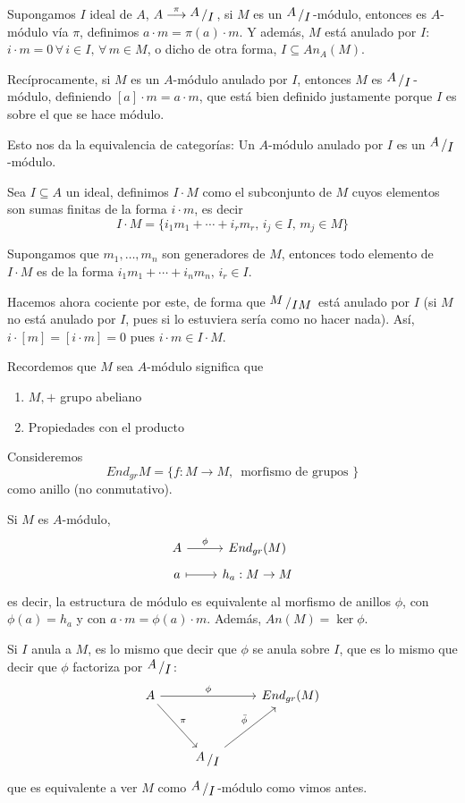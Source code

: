 \begin{obs}
    Supongamos $I$ ideal de $A$, $A \overset{\pi}{\longrightarrow} \modulo{A}{I}$, si $M$ es un $\modulo{A}{I}$-m\'odulo, entonces es $A$-m\'odulo v\'ia $\pi$, definimos $a\cdot m = \pi(a) \cdot m$. Y adem\'as, $M$ est\'a anulado por $I$: $i \cdot m = 0 \, \forall \, i \in I, \, \forall \, m \in M$, o dicho de otra forma, $I \subseteq An_A(M)$. 

    Rec\'iprocamente, si $M$ es un $A$-m\'odulo anulado por $I$, entonces $M$ es $\modulo{A}{I}$-m\'odulo, definiendo $[a] \cdot m = a \cdot m$, que est\'a bien definido justamente porque $I$ es sobre el que se hace m\'odulo.

    Esto nos da la equivalencia de categor\'ias: Un $A$-m\'odulo anulado por $I$ es un $\modulo{A}{I}$-m\'odulo.

    Sea $I \subseteq A$ un ideal, definimos $I \cdot M$ como el subconjunto de $M$ cuyos elementos son sumas finitas de la forma $i \cdot m$, es decir
    $$I\cdot M = \{ i_1 m_1 + \cdots + i_r m_r , \, i_j \in I, \, m_j \in M \}$$

    Supongamos que $m_1, \ldots, m_n$ son generadores de $M$, entonces todo elemento de $I\cdot M$ es de la forma $i_1 m_1 + \cdots + i_n m_n , \, i_r \in I$.

    Hacemos ahora cociente por este, de forma que $\modulo{M}{IM}$ est\'a anulado por $I$ (si $M$ no est\'a anulado por $I$, pues si lo estuviera sería como no hacer nada). As\'i, $i \cdot [m] = [i\cdot m] = 0$ pues $i\cdot m \in I\cdot M$. 

    Recordemos que $M$ sea $A$-m\'odulo significa que \vspace{-5mm}
    \begin{enumerate}
        \item $M,+$ grupo abeliano
        \item Propiedades con el producto
    \end{enumerate}
    Consideremos
    $$End_{gr} M = \{ f: M \longrightarrow M , \, \text{ morfismo de grupos }\}$$
    como anillo (no conmutativo).

    Si $M$ es $A$-m\'odulo, 
    $$\bt A \arrow{r}{\phi} & End_{gr}(M) \\[-5mm] a \arrow[mapsto]{r} & h_a: M \rightarrow M   \et$$
    es decir, la estructura de m\'odulo es equivalente al morfismo de anillos $\phi$, con $\phi(a)=h_a$ y con $a\cdot m = \phi(a) \cdot m$. Adem\'as, $An(M) = \ker  \phi$. 
    
    Si $I$ anula a $M$, es lo mismo que decir que $\phi$ se anula sobre $I$, que es lo mismo que decir que $\phi$ factoriza por $\modulo{A}{I}$: 
    $$\bt A \arrow{rr}{\phi} \arrow{rd}{\pi} & & End_{gr}(M) \\[5mm] & \arrow{ur}{\bar \phi} \modulo{A}{I}   \et$$
    que es equivalente a ver $M$ como $\modulo{A}{I}$-m\'odulo como vimos antes.
\end{obs}
